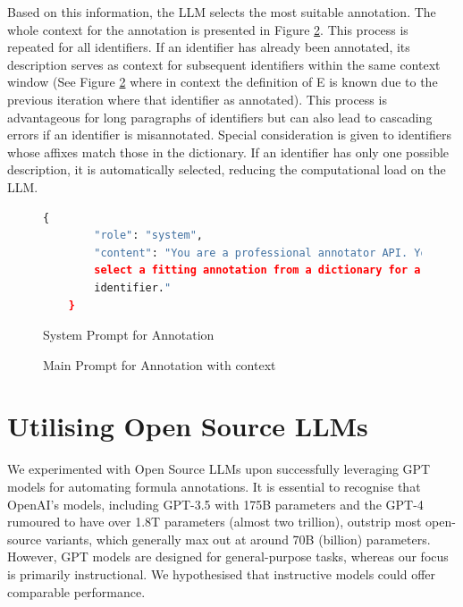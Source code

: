 Based on this information, the LLM selects the most suitable annotation. The whole context for the annotation is presented in Figure \ref{fig:prompt_anno_main}. This process is repeated for all identifiers. If an identifier has already been annotated, its description serves as context for subsequent identifiers within the same context window (See Figure \ref{fig:prompt_anno_main} where in context the definition of E is known due to the previous iteration where that identifier as annotated). This process is advantageous for long paragraphs of identifiers but can also lead to cascading errors if an identifier is misannotated. Special consideration is given to identifiers whose affixes match those in the dictionary. If an identifier has only one possible description, it is automatically selected, reducing the computational load on the LLM.

\begin{figure}[htpb]
  \centering
  \begin{lstlisting}[language=python]
    {
        "role": "system",
        "content": "You are a professional annotator API. Your job is to 
        select a fitting annotation from a dictionary for a mathematical
        identifier."
    }
  \end{lstlisting}
  \caption[System Prompt for Annotation]{System Prompt for Annotation}\label{fig:prompt_anno_system}
\end{figure}

\begin{figure}[htpb]
  \centering
  \quad 
  \caption[User Prompt for Annotation]{Main Prompt for Annotation with context}\label{fig:prompt_anno_main}
\end{figure}

\section{Utilising Open Source LLMs}

We experimented with Open Source LLMs upon successfully leveraging GPT models for automating formula annotations. It is essential to recognise that OpenAI's models, including GPT-3.5 with 175B parameters and the GPT-4 rumoured to have over 1.8T parameters (almost two trillion), outstrip most open-source variants, which generally max out at around 70B (billion) parameters. However, GPT models are designed for general-purpose tasks, whereas our focus is primarily instructional. We hypothesised that instructive models could offer comparable performance.

